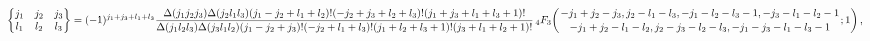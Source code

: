 \[\begin{Bmatrix}j_{1}&j_{2}&j_{3}\\
l_{1}&l_{2}&l_{3}\end{Bmatrix}={(-1)^{j_{1}+j_{3}+l_{1}+l_{3}}}\frac{\Delta(j_%
{1}j_{2}j_{3})\Delta(j_{2}l_{1}l_{3})(j_{1}-j_{2}+l_{1}+l_{2})!(-j_{2}+j_{3}+l%
_{2}+l_{3})!(j_{1}+j_{3}+l_{1}+l_{3}+1)!}{\Delta(j_{1}l_{2}l_{3})\Delta(j_{3}l%
_{1}l_{2})(j_{1}-j_{2}+j_{3})!(-j_{2}+l_{1}+l_{3})!(j_{1}+l_{2}+l_{3}+1)!(j_{3%
}+l_{1}+l_{2}+1)!}\*\mathop{{{}_{4}F_{3}}\/}\nolimits\!\left({-j_{1}+j_{2}-j_{%
3},j_{2}-l_{1}-l_{3},-j_{1}-l_{2}-l_{3}-1,-j_{3}-l_{1}-l_{2}-1\atop-j_{1}+j_{2%
}-l_{1}-l_{2},j_{2}-j_{3}-l_{2}-l_{3},-j_{1}-j_{3}-l_{1}-l_{3}-1};1\right),\]